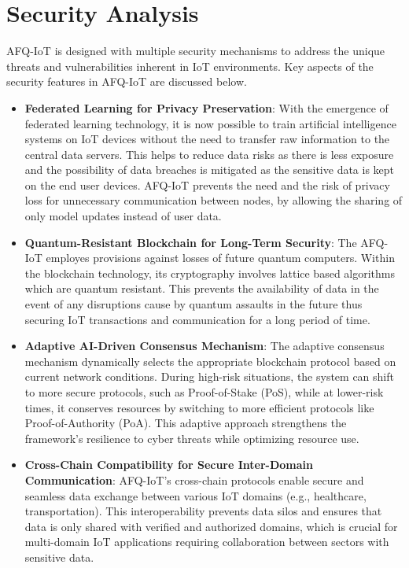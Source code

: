 \documentclass[12pt, oneside]{report}
\begin{document}
\section{Security Analysis }

AFQ-IoT is designed with multiple security mechanisms to address the unique threats and vulnerabilities inherent in IoT environments. Key aspects of the security features in AFQ-IoT are discussed below.

\begin{itemize}

    \item \textbf{Federated Learning for Privacy Preservation}: With the emergence of federated learning technology, it is now possible to train artificial intelligence systems on IoT devices without the need to transfer raw information to the central data servers. This helps to reduce data risks as there is less exposure and the possibility of data breaches is mitigated as the sensitive data is kept on the end user devices. AFQ-IoT prevents the need and the risk of privacy loss for unnecessary communication between nodes, by allowing the sharing of only model updates instead of user data.


    \item \textbf{Quantum-Resistant Blockchain for Long-Term Security}: The AFQ-IoT employes provisions against losses of future quantum computers. Within the blockchain technology, its cryptography involves lattice based algorithms which are quantum resistant. This prevents the availability of data in the event of any disruptions cause by quantum assaults in the future thus securing IoT transactions and communication for a long period of time.

    \item \textbf{Adaptive AI-Driven Consensus Mechanism}: The adaptive consensus mechanism dynamically selects the appropriate blockchain protocol based on current network conditions. During high-risk situations, the system can shift to more secure protocols, such as Proof-of-Stake (PoS), while at lower-risk times, it conserves resources by switching to more efficient protocols like Proof-of-Authority (PoA). This adaptive approach strengthens the framework’s resilience to cyber threats while optimizing resource use.

    \item \textbf{Cross-Chain Compatibility for Secure Inter-Domain Communication}: AFQ-IoT’s cross-chain protocols enable secure and seamless data exchange between various IoT domains (e.g., healthcare, transportation). This interoperability prevents data silos and ensures that data is only shared with verified and authorized domains, which is crucial for multi-domain IoT applications requiring collaboration between sectors with sensitive data.


\end{itemize}
\end{document}

